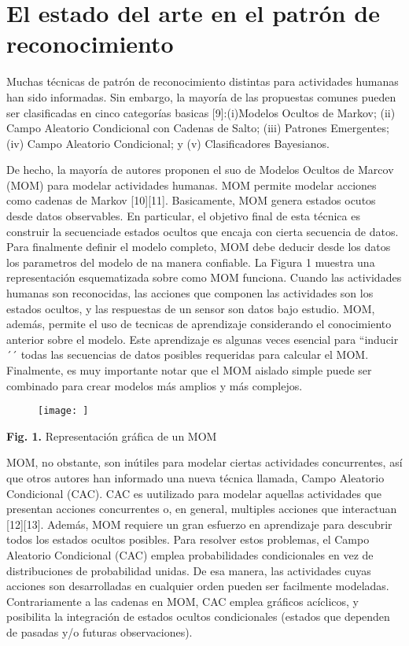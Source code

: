 \documentclass[a4paper]{article}
\begin{document}
\section{El estado del arte en el patrón de reconocimiento}
Muchas técnicas de patrón de reconocimiento distintas para actividades humanas han sido informadas. Sin embargo, la mayoría de las propuestas comunes pueden ser clasificadas en cinco categorías basicas [9]:(i)Modelos Ocultos de Markov; (ii) Campo Aleatorio Condicional con Cadenas de Salto; (iii) Patrones Emergentes; (iv) Campo Aleatorio Condicional; y (v) Clasificadores Bayesianos.
\begin{center}De hecho, la mayoría de autores proponen el suo de Modelos Ocultos de Marcov (MOM) para modelar actividades humanas. MOM permite modelar acciones como cadenas de Markov [10][11]. Basicamente, MOM genera estados ocutos desde datos observables. En particular, el objetivo final de esta técnica es construir la secuenciade estados ocultos que encaja con cierta secuencia de datos. Para finalmente definir el modelo completo, MOM debe deducir desde los datos los parametros del modelo de na manera confiable. La Figura 1 muestra una representación esquematizada
sobre como MOM funciona. Cuando las actividades humanas son reconocidas, las acciones que componen las actividades son los estados ocultos, y las respuestas de un sensor son datos bajo estudio. MOM, además, permite el uso de tecnicas de aprendizaje considerando el conocimiento anterior sobre el modelo. Este aprendizaje es algunas veces esencial para ``inducir´´ todas las secuencias de datos posibles requeridas para calcular el MOM. Finalmente, es muy importante notar que el MOM aislado simple puede ser combinado para crear modelos más amplios y más complejos. 
\end{center}
\begin{figure}[h]
    \centering
    \texttt{[image: ]}
\end{figure}
\begin{center}\textbf{Fig. 1.} Representación gráfica de un MOM\end{center}
        \begin{center}
                MOM, no obstante, son inútiles para modelar ciertas actividades concurrentes, así que otros autores han informado una nueva técnica llamada, Campo Aleatorio Condicional (CAC). CAC es uutilizado para modelar aquellas actividades que presentan acciones concurrentes o, en general, multiples acciones que interactuan [12][13]. Además, MOM requiere un gran esfuerzo en aprendizaje para descubrir todos los estados ocultos posibles. Para resolver estos problemas, el Campo Aleatorio Condicional (CAC) emplea probabilidades condicionales en vez de distribuciones de probabilidad unidas. De esa manera, las actividades cuyas acciones son desarrolladas en cualquier orden pueden ser facilmente modeladas. Contrariamente a las cadenas en MOM, CAC emplea gráficos acíclicos, y posibilita la integración de estados ocultos condicionales (estados que dependen de pasadas y/o futuras observaciones).
                \end{center}
\end{document}
